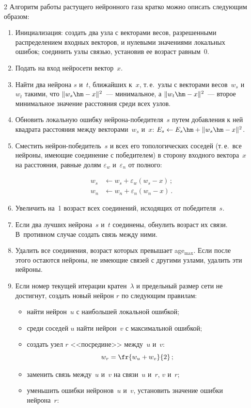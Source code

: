\begin{multicols}{2}
Алгоритм работы растущего нейронного газа кратко можно описать следующим образом:
\begin{enumerate}
\item Инициализация: создать два узла с векторами весов, разрешенными распределением входных 
векторов, и нулевыми значениями локальных ошибок; соединить узлы связью, установив ее 
возраст равным~0.
\item Подать на вход нейросети вектор~$x$.
\item Найти два нейрона $s$ и~$t$, ближайших к~$x$, т.\,е.\ узлы с векторами весов~$w_s$ и 
$w_t$ такими, что $\Vert w_s\hm-x\Vert^2$~--- минимальное, а $\Vert w_t\hm-x\Vert^2$~--- второе 
минимальное значение расстояния среди всех узлов.
\item Обновить локальную ошибку ней\-ро\-на-по\-бе\-ди\-те\-ля~$s$ путем добавления к ней 
квадрата расстояния между векторами~$w_s$ и~$x$: $E_s\leftarrow E_s\hm+\Vert w_s\hm-
x\Vert^2$.\\[-13pt]
\item Сместить нейрон-по\-бе\-ди\-тель~$s$ и всех его топологических соседей (т.\,е.\ все нейроны, 
име\-ющие соединение с победителем) в сторону входного вектора~$x$ на расстояния, равные долям 
$\varepsilon_w$ и~$\varepsilon_n$ от полного:

\noindent
\begin{align*}
w_s&\leftarrow w_s+\varepsilon_w(w_s-x)\,;\\
w_n&\leftarrow w_n+\varepsilon_n(w_n-x)\,.
\end{align*}
\item Увеличить на~1 возраст всех соединений, исходящих от победителя~$s$.\\[-13pt]

\item Если два лучших нейрона~$s$ и~$t$ соединены, обнулить возраст их связи. В~противном 
случае создать связь между ними.\\[-13pt]
\item Удалить все соединения, возраст которых превышает age$_{\max}$. Если после этого остаются 
нейроны, не имеющие связей с другими узлами, удалить эти нейроны.\\[-13pt]
\item Если номер текущей итерации кратен~$\lambda$ и предельный размер сети не достигнут, 
создать новый нейрон $r$ по следующим правилам:\\[-13pt]
\begin{itemize}
\item найти нейрон~$u$ с наибольшей локальной ошибкой;\\[-14pt]
\item среди соседей $u$ найти нейрон~$v$ с максимальной ошибкой;\\[-14pt]
\item создать узел $r$ <<посредине>> между~$u$ и~$v$:
$$
w_r =\fr{w_u+w_v}{2}\,;
$$
\item заменить связь между~$u$ и~$v$ на связи~$u$ и~$r$, $v$ и~$r$;\\[-14pt]
\item уменьшить ошибки нейронов~$u$ и~$v$, установить значение ошибки нейрона~$r$:


\end{itemize}
\end{enumerate}
\end{multicols}
